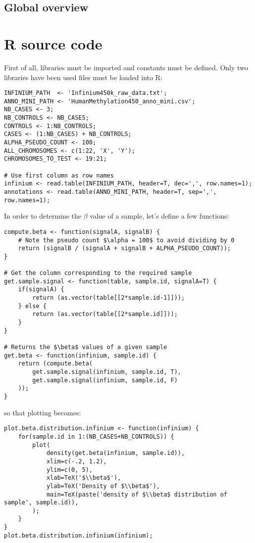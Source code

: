 \documentclass{article}
\begin{document}
\subsection{Global overview}



\newpage

{}

\newpage
\section{R source code}

First of all, libraries must be imported and constants must be defined. Only two libraries have been used files must be loaded into R:

\begin{lstlisting}
INFINIUM_PATH  <- 'Infinium450k_raw_data.txt';
ANNO_MINI_PATH <- 'HumanMethylation450_anno_mini.csv';
NB_CASES <- 3;
NB_CONTROLS <- NB_CASES;
CONTROLS <- 1:NB_CONTROLS;
CASES <- (1:NB_CASES) + NB_CONTROLS;
ALPHA_PSEUDO_COUNT <- 100;
ALL_CHROMOSOMES <- c(1:22, 'X', 'Y');
CHROMOSOMES_TO_TEST <- 19:21;

# Use first column as row names
infinium <- read.table(INFINIUM_PATH, header=T, dec=',', row.names=1);
annotations <- read.table(ANNO_MINI_PATH, header=T, sep=',', row.names=1);
\end{lstlisting}

In order to determine the $\beta$ value of a sample, let's define a few functions:
\begin{lstlisting}
compute.beta <- function(signalA, signalB) {
	# Note the pseudo count $\alpha = 100$ to avoid dividing by 0
	return (signalB / (signalA + signalB + ALPHA_PSEUDO_COUNT));
}

# Get the column corresponding to the required sample
get.sample.signal <- function(table, sample.id, signalA=T) {
	if(signalA) {
		return (as.vector(table[[2*sample.id-1]]));
	} else {
		return (as.vector(table[[2*sample.id]]));
	}
}

# Returns the $\beta$ values of a given sample
get.beta <- function(infinium, sample.id) {
	return (compute.beta(
		get.sample.signal(infinium, sample.id, T),
		get.sample.signal(infinium, sample.id, F)
	));
}
\end{lstlisting}

so that plotting becomes:
\begin{lstlisting}
plot.beta.distribution.infinium <- function(infinium) {
	for(sample.id in 1:(NB_CASES+NB_CONTROLS)) {
		plot(
			density(get.beta(infinium, sample.id)),
			xlim=c(-.2, 1.2),
			ylim=c(0, 5),
			xlab=TeX('$\\beta$'),
			ylab=TeX('Density of $\\beta$'),
			main=TeX(paste('density of $\\beta$ distribution of sample', sample.id)),
		);
	}
}
plot.beta.distribution.infinium(infinium);
\end{lstlisting}
\end{document}
